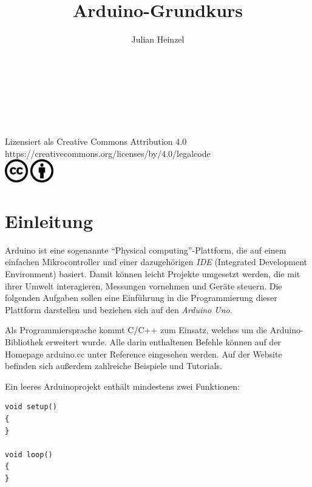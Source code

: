 \documentclass[10pt,a4paper]{article}
\title{Arduino-Grundkurs}
\author{Julian Heinzel}
\begin{document}
\begin{center}
	\makeatletter
	{\LARGE\textbf{\@title}}\\\bigskip
	{\Large\@author}\\\medskip
	{\large\@date}\\
	\makeatother
	\vspace{0.3cm}
	\\\medskip
	Lizensiert als Creative Commons Attribution 4.0\\
	https://creativecommons.org/licenses/by/4.0/legalcode
	\\\medskip
	\includegraphics[width=1cm]{CC.png}
	\includegraphics[width=1cm]{BY.png}
\end{center}
\vspace{0.3cm}
\tableofcontents
\vspace{1cm}


\section{Einleitung}
Arduino ist eine sogenannte "`Physical computing"'-Plattform, die auf einem einfachen Mikrocontroller und einer dazugehörigen \emph{IDE} (Integrated Development Environment) basiert. Damit können leicht Projekte umgesetzt werden, die mit ihrer Umwelt interagieren, Messungen vornehmen und Geräte steuern. Die folgenden Aufgaben sollen eine Einführung in die Programmierung dieser Plattform darstellen und beziehen sich auf den \emph{Arduino Uno}.
\bigskip

Als Programmiersprache kommt C/C++ zum Einsatz, welches um die Arduino-Bibliothek erweitert wurde. Alle darin enthaltenen Befehle können auf der Homepage arduino.cc unter Reference eingesehen werden. Auf der Website befinden sich außerdem zahlreiche Beispiele und Tutorials.
\bigskip

Ein leeres Arduinoprojekt enthält mindestens zwei Funktionen:
\begin{lstlisting}
void setup()
{
}

void loop()
{
}
\end{lstlisting}
\end{document}
